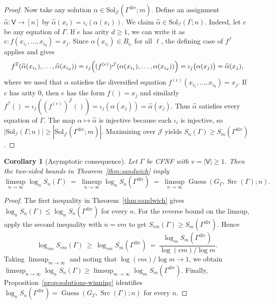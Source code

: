 \documentclass[11pt]{article}
\theoremstyle{definition}
\theoremstyle{plain}
\newtheorem{corollary}[definition]{Corollary}
\newcommand{\Vars}{\mathsf{V}}
\newcommand{\Sol}{\mathrm{Sol}}
\newcommand{\Sn}{S_n}
\DeclareMathOperator{\Guess}{Guess}
\DeclareMathOperator{\Src}{Src}
\begin{document}
\begin{proof}
Now take any solution $\alpha\in\Sol_{\mathcal J}(\Gamma^{\mathrm{div}};m)$.
Define an assignment $\widehat\alpha:\Vars\to [n]$ by $\widehat\alpha(x_i)=\iota_i(\alpha(x_i))$.
We claim $\widehat\alpha\in\Sol_{\mathcal I}(\Gamma;n)$.
Indeed, let $e$ be any equation of $\Gamma$.
If $e$ has arity $d\ge 1$, we can write it as $e:f(x_{i_1},\dots,x_{i_d})=x_j$.
Since $\widehat\alpha(x_{i_\ell})\in B_{i_\ell}$ for all $\ell$, the defining case of $f^{\mathcal I}$ applies and gives
\[
 f^{\mathcal I}(\widehat\alpha(x_{i_1}),\dots,\widehat\alpha(x_{i_d}))
 = \iota_j\Bigl((f^{(e)})^{\mathcal J}(\alpha(x_{i_1}),\dots,\alpha(x_{i_d}))\Bigr)
 = \iota_j\bigl(\alpha(x_j)\bigr)
 = \widehat\alpha(x_j),
\]
where we used that $\alpha$ satisfies the diversified equation $f^{(e)}(x_{i_1},\dots,x_{i_d})=x_j$.
If $e$ has arity $0$, then $e$ has the form $f()=x_j$ and similarly
$f^{\mathcal I}()=\iota_j((f^{(e)})^{\mathcal J}())=\iota_j(\alpha(x_j))=\widehat\alpha(x_j)$.
Thus $\widehat\alpha$ satisfies every equation of $\Gamma$.
The map $\alpha\mapsto\widehat\alpha$ is injective because each $\iota_i$ is injective, so
$|\Sol_{\mathcal I}(\Gamma;n)|\ge |\Sol_{\mathcal J}(\Gamma^{\mathrm{div}};m)|$.
Maximizing over $\mathcal J$ yields $\Sn(\Gamma)\ge S_m(\Gamma^{\mathrm{div}})$.
\end{proof}

\begin{corollary}[Asymptotic consequence]
\label{cor:sandwich-asympt}
Let $\Gamma$ be CFNF with $v=|\Vars|\ge 1$.
Then the two-sided bounds in Theorem~\ref{thm:sandwich} imply
\[
\limsup_{n\to\infty} \log_n \Sn(\Gamma)
\;=\;
\limsup_{n\to\infty} \log_n \Sn(\Gamma^{\mathrm{div}})
\;=\;
\limsup_{n\to\infty} \Guess(G_\Gamma,\Src(\Gamma);n).
\]
\end{corollary}

\begin{proof}
The first inequality in Theorem~\ref{thm:sandwich} gives
$\log_n \Sn(\Gamma)\le \log_n \Sn(\Gamma^{\mathrm{div}})$ for every $n$.
For the reverse bound on the limsup, apply the second inequality with $n=vm$ to get
$S_{vm}(\Gamma)\ge S_m(\Gamma^{\mathrm{div}})$.
Hence
\[
\log_{vm} S_{vm}(\Gamma)\ \ge\ \log_{vm} S_m(\Gamma^{\mathrm{div}})
\ =\ \frac{\log_m S_m(\Gamma^{\mathrm{div}})}{\log(vm)/\log m}.
\]
Taking $\limsup_{m\to\infty}$ and noting that $\log(vm)/\log m\to 1$, we obtain
\(
\limsup_{n\to\infty} \log_n \Sn(\Gamma)
\ge
\limsup_{m\to\infty} \log_m S_m(\Gamma^{\mathrm{div}}).
\)
Finally, Proposition~\ref{prop:solutions-winning} identifies
$\log_n \Sn(\Gamma^{\mathrm{div}})=\Guess(G_\Gamma,\Src(\Gamma);n)$ for every $n$.
\end{proof}
\end{document}
